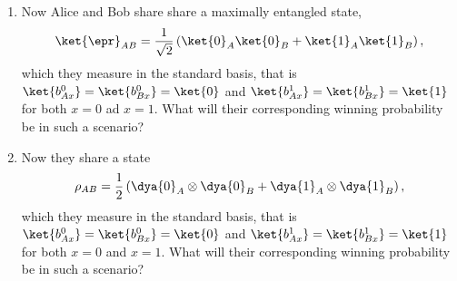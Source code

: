 \begin{exercises}
\begin{enumerate}
%
\item Now Alice and Bob share share a maximally entangled state,
\begin{equation*}
\ket{\epr}_{AB} =  \frac{1}{\sqrt{2}}\left(\ket{0}_{A}\ket{0}_B + \ket{1}_{A}\ket{1}_B\right),
\end{equation*}
which they measure in the standard basis, that is $\ket{b^0_{Ax}}=\ket{b^0_{Bx}}=\ket{0}$ and $\ket{b^1_{Ax}}=\ket{b^1_{Bx}}=\ket{1}$ for both $x=0$ ad $x=1$. What will their corresponding winning probability be in such a scenario?
%
%
\item Now they share a state
\begin{equation*}
\rho_{AB} =  \frac{1}{2}\left(\dya{0}_A \otimes \dya{0}_B + \dya{1}_A \otimes \dya{1}_B\right),
\end{equation*}
which they measure in the standard basis, that is $\ket{b^0_{Ax}}=\ket{b^0_{Bx}}=\ket{0}$ and $\ket{b^1_{Ax}}=\ket{b^1_{Bx}}=\ket{1}$ for both $x=0$ and $x=1$. What will their corresponding winning probability be in such a scenario?
%

\end{enumerate}
\end{exercises}
